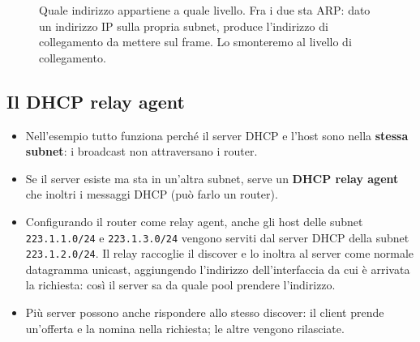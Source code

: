 \begin{figure}[H]
\centering
{}
\caption{Quale indirizzo appartiene a quale livello. Fra i due sta ARP: dato un indirizzo IP sulla propria subnet, produce
         l'indirizzo di collegamento da mettere sul frame. Lo smonteremo al livello di collegamento.}
\end{figure}

\subsection{Il DHCP relay agent}

\begin{itemize}
    \item Nell'esempio tutto funziona perché il server DHCP e l'host sono nella \textbf{stessa subnet}: i broadcast non
          attraversano i router.
    \item Se il server esiste ma sta in un'altra subnet, serve un \textbf{DHCP relay agent} che inoltri i messaggi DHCP (può
          farlo un router).
    \item Configurando il router come relay agent, anche gli host delle subnet \texttt{223.1.1.0/24} e \texttt{223.1.3.0/24}
          vengono serviti dal server DHCP della subnet \texttt{223.1.2.0/24}. Il relay raccoglie il discover e lo inoltra al
          server come normale datagramma unicast, aggiungendo l'indirizzo dell'interfaccia da cui è arrivata la richiesta:
          così il server sa da quale pool prendere l'indirizzo.
    \item Più server possono anche rispondere allo stesso discover: il client prende un'offerta e la nomina nella richiesta;
          le altre vengono rilasciate.
\end{itemize}

